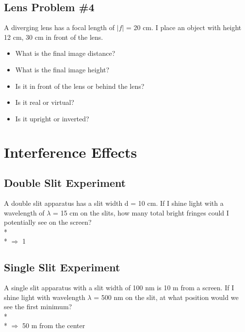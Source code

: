 \documentclass[11pt]{article}
\begin{document}
\subsection{Lens Problem \#4}
A diverging lens has a focal length of $|f|$ = 20 cm.  I place an object with height 12 cm, 30 cm in front of the lens.

\begin{itemize}
\item What is the final image distance?
\item What is the final image height?
\item Is it in front of the lens or behind the lens?  
\item Is it real or virtual?
\item Is it upright or inverted?
\end{itemize}





\pagebreak
\section{Interference Effects}

\subsection{Double Slit Experiment}
A double slit apparatus has a slit width d = 10 cm.  If I shine light with a wavelength of $\lambda$ = 15 cm on the slits, how many total bright fringes could I potentially see on the screen?\\*\\*
$\Rightarrow$ 1

\subsection{Single Slit Experiment}
A single slit apparatus with a slit width of 100 nm is 10 m from a screen.  If I shine light with wavelength $\lambda$ = 500 nm on the slit, at what position would we see the first minimum?\\*\\*
$\Rightarrow$ 50 m from the center

\end{document}
